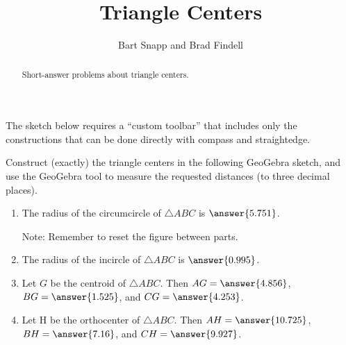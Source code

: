 \documentclass[nooutcomes]{ximera}
\title{Triangle Centers}
\author{Bart Snapp and Brad Findell}
\begin{document}
\begin{abstract}
Short-answer problems about triangle centers. 
\end{abstract}
\maketitle


\begin{warning}
The sketch below requires a ``custom toolbar'' that includes only the constructions that can be done directly with compass and straightedge.  
\end{warning}

\begin{problem}
Construct (exactly) the triangle centers in the following 
GeoGebra sketch, and use the GeoGebra tool to measure the requested distances (to three decimal places). 
\begin{center}  
\end{center}
%
\begin{enumerate}
\item The radius of the circumcircle of $\triangle ABC$ is 
$\answer{5.751}$.  

Note: Remember to reset the figure between parts.   

\item The radius of the incircle of $\triangle ABC$ is 
$\answer{0.995}$.  

\item Let $G$ be the centroid of $\triangle ABC$.  
Then $AG = \answer{4.856}$, $BG = \answer{1.525}$, 
and $CG = \answer{4.253}$.  

\item Let H be the orthocenter of $\triangle ABC$. 
Then $AH = \answer{10.725}$, $BH = \answer{7.16}$, 
and $CH = \answer{9.927}$. 
\end{enumerate}

\end{problem}
\end{document}
